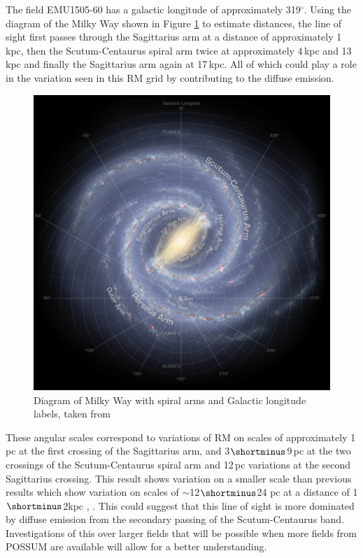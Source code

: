 The field EMU1505-60 has a galactic longitude of approximately 319$^\circ$. Using the diagram of the Milky Way shown in Figure \ref{fig:mw map} to estimate distances, the line of sight first passes through the Sagittarius arm at a distance of approximately 1$\,$kpc, then the Scutum-Centaurus spiral arm twice at approximately 4$\,$kpc and 13$\,$kpc and finally the Sagittarius arm again at 17$\,$kpc. All of which could play a role in the variation seen in this RM grid by contributing to the diffuse emission.

\begin{figure}
    \centering
    \includegraphics[width=\linewidth]{Thesis_Template/Figures/Milky Way Map.png}
    \caption{Diagram of Milky Way with spiral arms and Galactic longitude labels, taken from \cite{spitzer_2009}}
    \label{fig:mw map}
\end{figure}

These angular scales correspond to variations of RM on scales of approximately 1$\,$pc at the first crossing of the Sagittarius arm, and 3$\shortminus$9$\,$pc at the two crossings of the Scutum-Centaurus spiral arm and 12$\,$pc variations at the second Sagittarius crossing. This result shows variation on a smaller scale than previous results which show variation on scales of $\sim$12$\shortminus$24 pc at a distance of 1$\shortminus$2kpc \cite{vanderwoude2024prototypefaradayrotationmeasure}, \cite{Haverkorn_2006}. This could suggest that this line of sight is more dominated by diffuse emission from the secondary passing of the Scutum-Centaurus band. Investigations of this over larger fields that will be possible when more fields from POSSUM are available will allow for a better understanding. 



